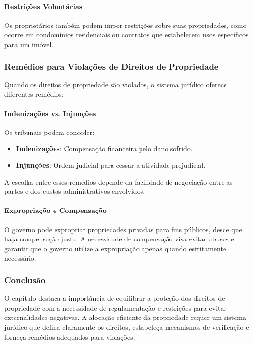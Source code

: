 \documentclass[a4paper,12pt]{article}[abntex2]
\begin{document}
\paragraph{Restrições Voluntárias}
Os proprietários também podem impor restrições sobre suas propriedades, como ocorre em condomínios residenciais ou contratos que estabelecem usos específicos para um imóvel.

\subsubsection{Remédios para Violações de Direitos de Propriedade}
Quando os direitos de propriedade são violados, o sistema jurídico oferece diferentes remédios:

\paragraph{Indenizações vs. Injunções}
Os tribunais podem conceder:
\begin{itemize}
    \item \textbf{Indenizações}: Compensação financeira pelo dano sofrido.
    \item \textbf{Injunções}: Ordem judicial para cessar a atividade prejudicial.
\end{itemize}

A escolha entre esses remédios depende da facilidade de negociação entre as partes e dos custos administrativos envolvidos.

\paragraph{Expropriação e Compensação}
O governo pode expropriar propriedades privadas para fins públicos, desde que haja compensação justa. A necessidade de compensação visa evitar abusos e garantir que o governo utilize a expropriação apenas quando estritamente necessário.

\subsubsection{Conclusão}
O capítulo destaca a importância de equilibrar a proteção dos direitos de propriedade com a necessidade de regulamentação e restrições para evitar externalidades negativas. A alocação eficiente da propriedade requer um sistema jurídico que defina claramente os direitos, estabeleça mecanismos de verificação e forneça remédios adequados para violações.
\end{document}
